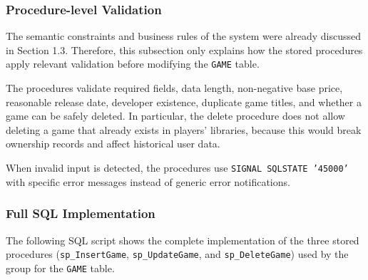 \subsubsection{Procedure-level Validation}

The semantic constraints and business rules of the system were already discussed in Section 1.3. 
Therefore, this subsection only explains how the stored procedures apply relevant validation before modifying the \texttt{GAME} table.

The procedures validate required fields, data length, non-negative base price, reasonable release date, developer existence, duplicate game titles, and whether a game can be safely deleted. 
In particular, the delete procedure does not allow deleting a game that already exists in players' libraries, because this would break ownership records and affect historical user data.

When invalid input is detected, the procedures use \texttt{SIGNAL SQLSTATE '45000'} with specific error messages instead of generic error notifications.
\subsubsection{Full SQL Implementation}

The following SQL script shows the complete implementation of the three stored procedures (\texttt{sp\_InsertGame}, \texttt{sp\_UpdateGame}, and \texttt{sp\_DeleteGame}) used by the group for the \texttt{GAME} table.

